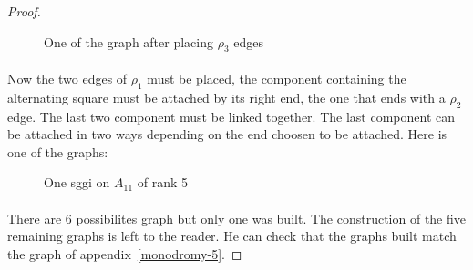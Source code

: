 \begin{proof}
\begin{figure}[H]
\begin{center}
\begin{tikzpicture}[scale=.8]
    \end{tikzpicture}
    \caption{One of the graph after placing $\rho_3$ edges}
  \end{center}
\end{figure}

\paragraph{}
Now the two edges of $\rho_1$ must be placed, the component containing the alternating square must be attached by its right end, the one that ends with a $\rho_2$ edge. The last two component must be linked together. The last component can be attached in two ways depending on the end choosen to be attached. Here is one of the graphs:

\begin{figure}[H]
  \begin{center}
    \caption{One sggi on $A_{11}$ of rank 5}
  \end{center}
\end{figure}

\paragraph{}
There are 6 possibilites graph but only one was built. The construction of the five remaining graphs is left to the reader. He can check that the graphs built match the graph of appendix~\ref{monodromy-5}.

\end{proof}


